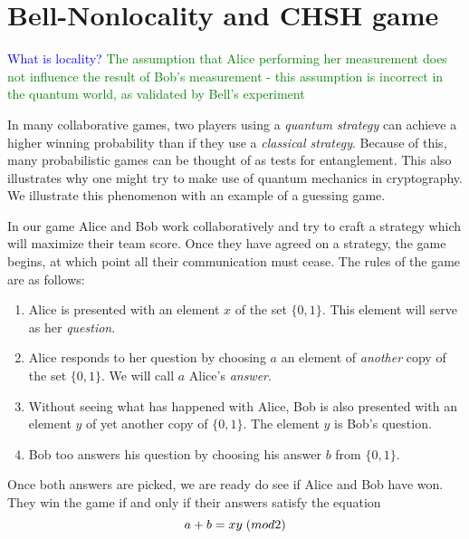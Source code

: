 
\pagebreak

\section{Bell-Nonlocality and CHSH game} \label{section: bell-nonlocality}

\textcolor{blue}{What is locality?}
\textcolor{green}{The assumption that Alice performing her measurement does not influence the result of Bob's measurement - this assumption is incorrect in the quantum world, as validated by Bell's experiment}



In many collaborative games, two players using a {\emph{quantum strategy}} can achieve a higher winning probability than if they use a {\emph{classical strategy}}. Because of this, many probabilistic games can be thought of as tests for entanglement.  This also illustrates why one might try to make use of quantum mechanics in cryptography.  We illustrate this phenomenon with an example of a guessing game.

In our game Alice and Bob work collaboratively and try to craft a strategy which will maximize their team score.  Once they have agreed on a strategy, the game begins, at which point all their communication must cease.  The rules of the game are as follows:
\begin{enumerate}
\item Alice is presented with an element $x$ of the set $\{0,1\}$.  This element will serve as her {\emph{question}}.
\item Alice responds to her question by choosing $a$ an element of {\emph{another}} copy of the set $\{0,1\}$.  We will call $a$ Alice's {\emph{answer}}. 
\item Without seeing what has happened with Alice, Bob is also presented with an element $y$ of yet another copy of $\{0,1\}$. The element $y$ is Bob's question.
\item Bob too answers his question by choosing his answer $b$ from $\{0,1\}$.
\end{enumerate}

Once both answers are picked, we are ready do see if Alice and Bob have won.  They win the game if and only if their answers satisfy the equation
\begin{equation*}
 a+b =xy\hspace{.1cm}(mod 2) 
\end{equation*}


